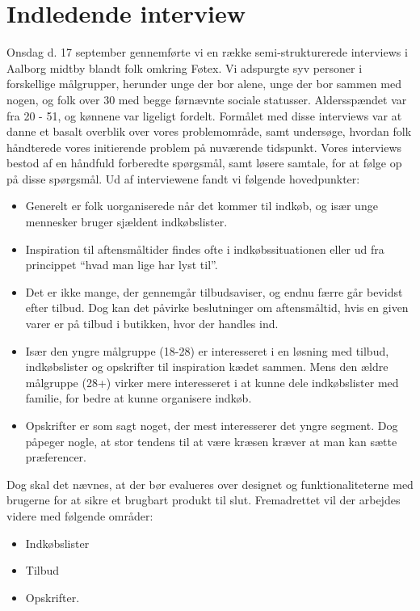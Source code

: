 \chapter{Indledende interview}
Onsdag d. 17 september gennemførte vi en række semi-strukturerede interviews i Aalborg midtby blandt folk omkring Føtex. Vi adspurgte syv personer i forskellige målgrupper, herunder unge der bor alene, unge der bor sammen med nogen, og  folk over 30 med begge førnævnte sociale statusser. Aldersspændet var fra 20 - 51, og kønnene var ligeligt fordelt. Formålet med disse interviews var at danne et basalt overblik over vores problemområde, samt undersøge, hvordan folk håndterede vores initierende problem på nuværende tidspunkt. Vores interviews bestod af en håndfuld forberedte spørgsmål, samt løsere samtale, for at følge op på disse spørgsmål. Ud af interviewene fandt vi følgende hovedpunkter:
\begin{itemize}
	\item Generelt er folk uorganiserede når det kommer til indkøb, og især unge mennesker bruger sjældent indkøbslister.
	\item Inspiration til aftensmåltider findes ofte i indkøbssituationen eller ud fra princippet “hvad man lige har lyst til”.
	\item Det er ikke mange, der gennemgår tilbudsaviser, og endnu færre går bevidst efter tilbud. Dog kan det påvirke beslutninger om aftensmåltid, hvis en given varer er på tilbud i butikken, hvor der handles ind.
	\item Især den yngre målgruppe (18-28) er interesseret i en løsning med tilbud, indkøbslister og opskrifter til inspiration kædet sammen. Mens den ældre målgruppe (28+) virker mere interesseret i at kunne dele indkøbslister med familie, for bedre at kunne organisere indkøb.
	\item Opskrifter er som sagt noget, der mest interesserer det yngre segment. Dog påpeger nogle, at stor tendens til at være kræsen kræver at man kan sætte præferencer. 
\end{itemize}

Dog skal det nævnes, at der bør evalueres over designet og funktionaliteterne med brugerne for at sikre et brugbart produkt til slut.
Fremadrettet vil der arbejdes videre med følgende områder:

\begin{itemize}
	\item Indkøbslister
	\item Tilbud
	\item Opskrifter.
\end{itemize}

